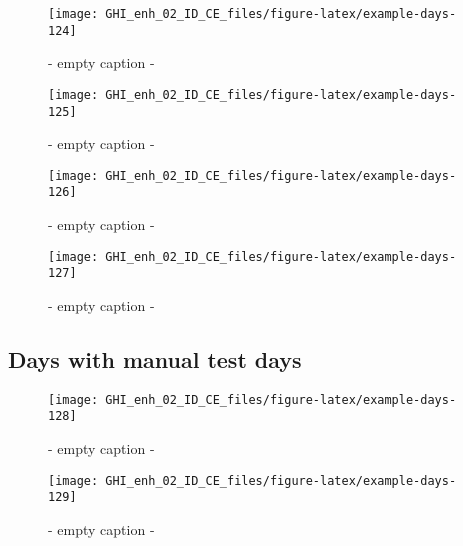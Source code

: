 \documentclass[
  10pt,
  a4paper,oneside]{article}
\begin{document}
\begin{figure}[H]

{\centering \texttt{[image: GHI\_enh\_02\_ID\_CE\_files/figure-latex/example-days-124]} 

}

\caption{ - empty caption - }\label{fig:example-days-124}
\end{figure}

\begin{figure}[H]

{\centering \texttt{[image: GHI\_enh\_02\_ID\_CE\_files/figure-latex/example-days-125]} 

}

\caption{ - empty caption - }\label{fig:example-days-125}
\end{figure}

\begin{figure}[H]

{\centering \texttt{[image: GHI\_enh\_02\_ID\_CE\_files/figure-latex/example-days-126]} 

}

\caption{ - empty caption - }\label{fig:example-days-126}
\end{figure}

\begin{figure}[H]

{\centering \texttt{[image: GHI\_enh\_02\_ID\_CE\_files/figure-latex/example-days-127]} 

}

\caption{ - empty caption - }\label{fig:example-days-127}
\end{figure}

\FloatBarrier

\hypertarget{days-with-manual-test-days}{%
\subsection{Days with manual test days}\label{days-with-manual-test-days}}

\begin{figure}[H]

{\centering \texttt{[image: GHI\_enh\_02\_ID\_CE\_files/figure-latex/example-days-128]} 

}

\caption{ - empty caption - }\label{fig:example-days-128}
\end{figure}

\begin{figure}[H]

{\centering \texttt{[image: GHI\_enh\_02\_ID\_CE\_files/figure-latex/example-days-129]} 

}

\caption{ - empty caption - }\label{fig:example-days-129}
\end{figure}
\end{document}
